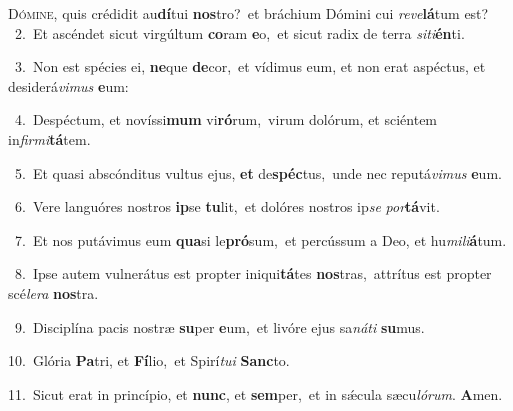 \lettrine{\initial\textcolor{\initialcolor}{D}}{ómine,} quis crédidit au\-\textbf{dí}\-tui \textbf{nos}\-tro?~\star et bráchium Dómini cui \textit{re}\-\textit{ve}\textbf{lá}tum est?\\
{\numbfont\textcolor{\numbcolor}{~2.}}~Et ascéndet sicut virgúltum \textbf{co}\-ram \textbf{e}\-o,~\star et sicut radix de terra \textit{si}\-\textit{ti}\textbf{én}ti.\par
{\numbfont\textcolor{\numbcolor}{~3.}}~Non est spécies ei, \textbf{ne}\-que \textbf{de}\-cor,~\star et vídimus eum, et non erat aspéctus, et desiderá\-\textit{vi}\-\textit{mus} \textbf{e}\-um:\par
{\numbfont\textcolor{\numbcolor}{~4.}}~Despéctum, et novíssi\textbf{mum} vi\-\textbf{ró}\-rum,~\star virum dolórum, et sciéntem in\-\textit{fir}\-\textit{mi}\textbf{tá}tem.\par
{\numbfont\textcolor{\numbcolor}{~5.}}~Et quasi abscónditus vultus ejus, \textbf{et} de\-\textbf{spéc}\-tus,~\star unde nec reputá\-\textit{vi}\-\textit{mus} \textbf{e}\-um.\par
{\numbfont\textcolor{\numbcolor}{~6.}}~Vere languóres nostros \textbf{ip}\-se \textbf{tu}\-lit,~\star et dolóres nostros ip\textit{se} \textit{por}\-\textbf{tá}vit.\par
{\numbfont\textcolor{\numbcolor}{~7.}}~Et nos putávimus eum \textbf{qua}\-si le\-\textbf{pró}\-sum,~\star et percússum a Deo, et hu\-\textit{mi}\-\textit{li}\textbf{á}tum.\par
{\numbfont\textcolor{\numbcolor}{~8.}}~Ipse autem vulnerátus est propter iniqui\-\textbf{tá}\-tes \textbf{nos}\-tras,~\star attrítus est propter scé\-\textit{le}\-\textit{ra} \textbf{nos}\-tra.\par
{\numbfont\textcolor{\numbcolor}{~9.}}~Disciplína pacis nostræ \textbf{su}\-per \textbf{e}\-um,~\star et livóre ejus sa\-\textit{ná}\-\textit{ti} \textbf{su}\-mus.\par
{\numbfont\textcolor{\numbcolor}{10.}}~Glória \textbf{Pa}\-tri, et \textbf{Fí}\-lio,~\star et Spirí\-\textit{tu}\-\textit{i} \textbf{Sanc}\-to.\par
{\numbfont\textcolor{\numbcolor}{11.}}~Sicut erat in princípio, et \textbf{nunc}\-, et \textbf{sem}\-per,~\star et in sǽcula sæcu\-\textit{ló}\-\textit{rum}. \textbf{A}\-men.\par
